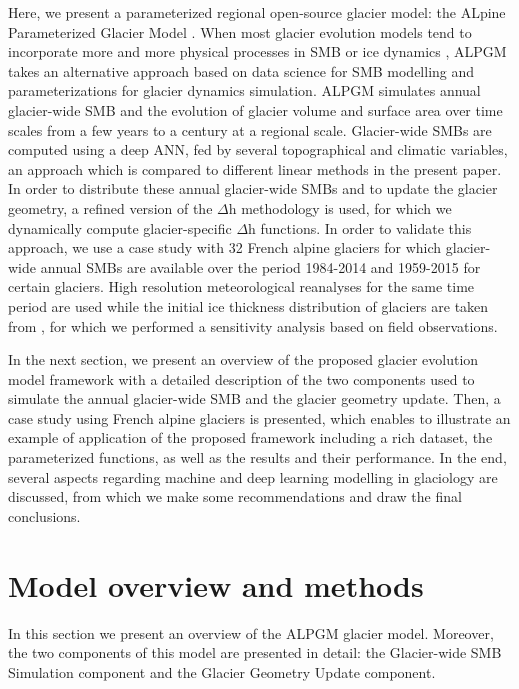 Here, we present a parameterized regional open-source glacier model: the ALpine Parameterized Glacier Model \cite[ALPGM,][]{bolibar_jordibolibar/alpgm:_2019}. When most glacier evolution models tend to incorporate more and more physical processes in SMB or ice dynamics \citep[e.g.,][]{maussion_open_2019, zekollari_modelling_2019}, ALPGM takes an alternative approach based on data science for SMB modelling and parameterizations for glacier dynamics simulation. ALPGM simulates annual glacier-wide SMB and the evolution of glacier volume and surface area over time scales from a few years to a century at a regional scale. Glacier-wide SMBs are computed using a deep ANN, fed by several topographical and climatic variables, an approach which is compared to different linear methods in the present paper. In order to distribute these annual glacier-wide SMBs and to update the glacier geometry, a refined version of the $\Delta$h methodology \citep[e.g.,][]{huss_modelling_2008} is used, for which we dynamically compute glacier-specific $\Delta$h functions. In order to validate this approach, we use a case study with 32 French alpine glaciers for which glacier-wide annual SMBs are available over the period 1984-2014 and 1959-2015 for certain glaciers. High resolution meteorological reanalyses for the same time period are used \citep[SAFRAN,][]{durand_reanalysis_2009} while the initial ice thickness distribution of glaciers are taken from \citet{farinotti_consensus_2019}, for which we performed a sensitivity analysis based on field observations.

In the next section, we present an overview of the proposed glacier evolution model framework with a detailed description of the two components used to simulate the annual glacier-wide SMB and the glacier geometry update. Then, a case study using French alpine glaciers is presented, which enables to illustrate an example of application of the proposed framework including a rich dataset, the parameterized functions, as well as the results and their performance. In the end, several aspects regarding machine and deep learning modelling in glaciology are discussed, from which we make some recommendations and draw the final conclusions.


\section{Model overview and methods} \label{methods:methods}

In this section we present an overview of the ALPGM glacier model. Moreover, the two components of this model are presented in detail: the Glacier-wide SMB Simulation component and the Glacier Geometry Update component.

